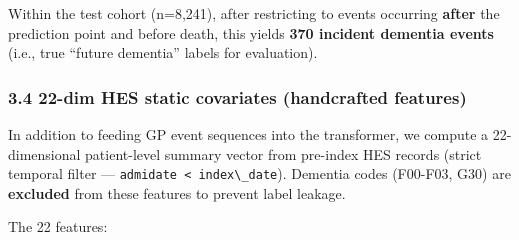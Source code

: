 \documentclass[
  11pt,
]{article}
\newcommand{\passthrough}[1]{#1}
\begin{document}
Within the test cohort (n=8,241), after restricting to events occurring
\textbf{after} the prediction point and before death, this yields
\textbf{370 incident dementia events} (i.e., true ``future dementia''
labels for evaluation).

\subsubsection{3.4 22-dim HES static covariates (handcrafted
features)}\label{dim-hes-static-covariates-handcrafted-features}

In addition to feeding GP event sequences into the transformer, we
compute a 22-dimensional patient-level summary vector from pre-index HES
records (strict temporal filter ---
\passthrough{\lstinline!admidate < index\_date!}). Dementia codes
(F00-F03, G30) are \textbf{excluded} from these features to prevent
label leakage.

The 22 features:
\end{document}

